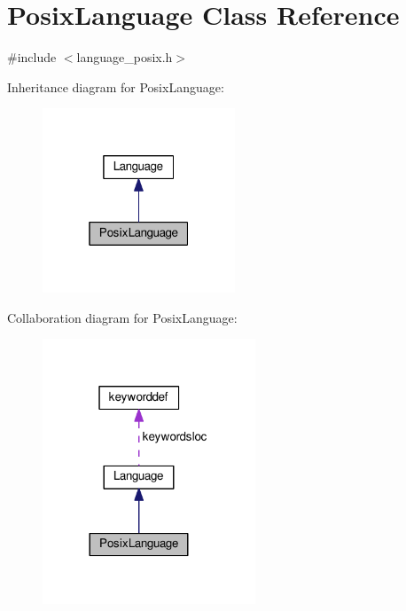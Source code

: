 \hypertarget{classPosixLanguage}{}\section{Posix\+Language Class Reference}
\label{classPosixLanguage}


{\ttfamily \#include $<$language\+\_\+posix.\+h$>$}



Inheritance diagram for Posix\+Language\+:
\nopagebreak
\begin{figure}[H]
\begin{center}
\leavevmode
\includegraphics[width=163pt]{d4/d87/classPosixLanguage__inherit__graph}
\end{center}
\end{figure}


Collaboration diagram for Posix\+Language\+:
\nopagebreak
\begin{figure}[H]
\begin{center}
\leavevmode
\includegraphics[width=180pt]{d1/d09/classPosixLanguage__coll__graph}
\end{center}
\end{figure}
